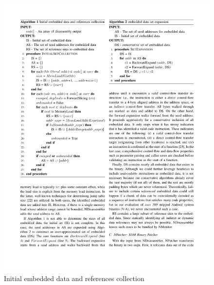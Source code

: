 



\begin{figure}[t]
	\centering
	\begin{minipage}[b]{0.45\textwidth}
		\centering	
		\begin{algorithm}[H]
		\caption{Initial embedded data and references collection}
		\label{algo:seedcollection}
		\includegraphics[width=\textwidth]{norax/figures/datarefcollection}
		\end{algorithm}

\end{minipage}
\end{figure}
